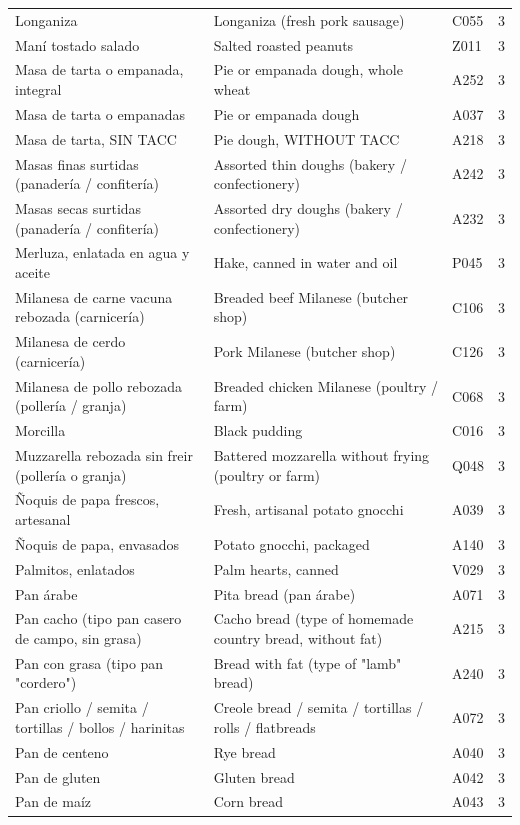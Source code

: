 {\begin{longtable}{p{4.3cm}p{5.5cm}p{1.5cm}p{0.7cm}}
Longaniza & Longaniza (fresh pork sausage) & C055 & 3\\
Maní tostado salado & Salted roasted peanuts & Z011 & 3\\
Masa de tarta o empanada, integral & Pie or empanada dough, whole wheat & A252 & 3\\
Masa de tarta o empanadas & Pie or empanada dough & A037 & 3\\
Masa de tarta, SIN TACC & Pie dough, WITHOUT TACC & A218 & 3\\
Masas finas surtidas (panadería / confitería) & Assorted thin doughs (bakery / confectionery) & A242 & 3\\
Masas secas surtidas (panadería / confitería) & Assorted dry doughs (bakery / confectionery) & A232 & 3\\
Merluza, enlatada en agua y aceite & Hake, canned in water and oil & P045 & 3\\
Milanesa de carne vacuna rebozada (carnicería) & Breaded beef Milanese (butcher shop) & C106 & 3\\
Milanesa de cerdo (carnicería) & Pork Milanese (butcher shop) & C126 & 3\\
Milanesa de pollo rebozada (pollería / granja) & Breaded chicken Milanese (poultry / farm) & C068 & 3\\
Morcilla & Black pudding & C016 & 3\\
Muzzarella rebozada sin freir (pollería o granja) & Battered mozzarella without frying (poultry or farm) & Q048 & 3\\
Ñoquis de papa frescos, artesanal & Fresh, artisanal potato gnocchi & A039 & 3\\
Ñoquis de papa, envasados & Potato gnocchi, packaged & A140 & 3\\
Palmitos, enlatados & Palm hearts, canned & V029 & 3\\
Pan árabe & Pita bread (pan árabe) & A071 & 3\\
Pan cacho (tipo pan casero de campo, sin grasa) & Cacho bread (type of homemade country bread, without fat) & A215 & 3\\
Pan con grasa (tipo pan "cordero") & Bread with fat (type of "lamb" bread) & A240 & 3\\
Pan criollo / semita / tortillas / bollos / harinitas & Creole bread / semita / tortillas / rolls / flatbreads & A072 & 3\\
Pan de centeno & Rye bread & A040 & 3\\
Pan de gluten & Gluten bread & A042 & 3\\
Pan de maíz & Corn bread & A043 & 3\\

\end{longtable}}
